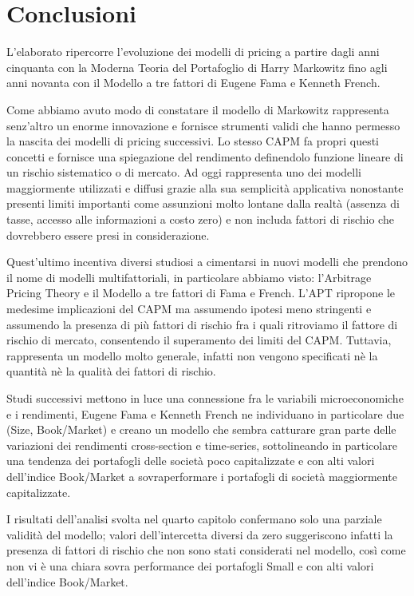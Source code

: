 \chapter{Conclusioni}

L'elaborato ripercorre l'evoluzione dei modelli di pricing a partire dagli anni cinquanta con la Moderna Teoria del Portafoglio di Harry Markowitz fino agli anni novanta con il Modello a tre fattori di Eugene Fama e Kenneth French.

Come abbiamo avuto modo di constatare il modello di Markowitz rappresenta senz'altro un enorme innovazione e fornisce strumenti validi che hanno permesso la nascita dei modelli di pricing successivi. Lo stesso CAPM fa propri questi concetti e fornisce una spiegazione del rendimento definendolo funzione lineare di un rischio sistematico o di mercato. Ad oggi rappresenta uno dei modelli maggiormente utilizzati e diffusi grazie alla sua semplicità applicativa nonostante presenti limiti importanti come assunzioni molto lontane dalla realtà (assenza di tasse, accesso alle informazioni a costo zero) e non includa fattori di rischio che dovrebbero essere presi in considerazione. 

Quest'ultimo incentiva diversi studiosi a cimentarsi in nuovi modelli che prendono il nome di modelli multifattoriali, in particolare abbiamo visto: l'Arbitrage Pricing Theory e il Modello a tre fattori di Fama e French. L'APT ripropone le medesime implicazioni del CAPM ma assumendo ipotesi meno stringenti e assumendo la presenza di più fattori di rischio fra i quali ritroviamo il fattore di rischio di mercato, consentendo il superamento dei limiti del CAPM.  Tuttavia, rappresenta un modello molto generale, infatti non vengono specificati nè la quantità nè la qualità dei fattori di rischio. 

Studi successivi mettono in luce una connessione fra le variabili microeconomiche e i rendimenti, Eugene Fama e Kenneth French ne individuano in particolare due (Size, Book/Market) e creano un modello che sembra catturare gran parte delle variazioni dei rendimenti cross-section e time-series, sottolineando in particolare una tendenza dei portafogli delle società poco capitalizzate e con alti valori dell'indice Book/Market a sovraperformare i portafogli di società maggiormente capitalizzate. 

I risultati dell'analisi svolta nel quarto capitolo confermano solo una parziale validità del modello; valori dell'intercetta diversi da zero suggeriscono infatti la presenza di fattori di rischio che non sono stati considerati nel modello, così come non vi è una chiara sovra performance dei portafogli Small e con alti valori dell'indice Book/Market. 

